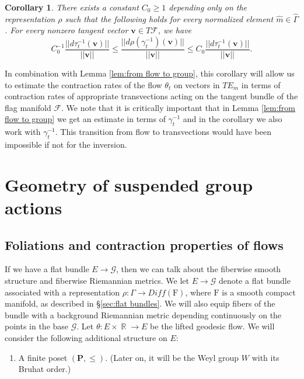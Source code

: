 \documentclass[12pt]{amsbook}%
\newtheorem{cor}[thm]{Corollary}
\theoremstyle{definition}
\theoremstyle{remark}
\numberwithin{section}{chapter}
\numberwithin{subsection}{section}
\numberwithin{figure}{chapter}
\DeclareMathOperator{\R}{\mathbb{R}}
\def\bP{{\mathbb{P}}}
\def\cF{{\mathscr{F}}}
\def\PP{{\mathbf{P}}}
\def\bv{\mathbf{v}}
\def\F{\mathrm{F}}
\def\Ga{\Gamma}
\def\ga{\gamma}
\def\cG{{\mathscr{G}}}
\def\kap{}
\begin{document}
{{\begin{cor}\label{cor:from group to transvections}
There exists a constant $C_0\geqslant 1$ depending only on the representation $\rho$ such that the following holds for every normalized element $\hat m\in \widehat\Ga$. For %
every nonzero tangent vector $\bv\in T\cF$, we have 
$$
C_0^{-1} \frac{||d\tau^{-1}_t(\bv)||}{||\bv||}\leqslant \frac{||d\rho(\ga^{-1}_t)(\bv)||}{||\bv||} \leqslant C_0  \frac{||d\tau^{-1}_t(\bv)||}{||\bv||}.
$$ 
\end{cor}

In combination with Lemma \ref{lem:from flow to group}, this corollary will allow us to estimate the contraction rates of the flow 
$\theta_t$ on vectors in $TE_{m}$ 
in terms of contraction rates of appropriate transvections acting on the tangent bundle of the flag manifold $\cF$. 
We note that it is critically important that in Lemma \ref{lem:from flow to group} we get an estimate in terms of $\ga_t^{-1}$ and in the corollary we also work 
with $\ga_t^{-1}$. This transition from flow to transvections would have been impossible if not for the inversion. 


\section{Geometry of suspended group actions}

\subsection{Foliations and contraction properties of flows} 

If we have a flat bundle $E\to \cG$, then we can talk about the fiberwise smooth structure and fiberwise Riemannian metrics. We let $E\to \cG$ denote a flat bundle associated with a representation $\rho: \Ga\to Diff(\F)$, where $\F$ is a smooth compact manifold, as described in \S \ref{sec:flat bundles}. We will also equip fibers of the bundle with a background Riemannian metric depending continuously on the points in the base $\cG$.  Let $\theta: E\times \R \to E$ be the lifted geodesic flow. We will consider the following additional structure on $E$:

\begin{enumerate}
\item A finite poset $(\PP, \le)$. (Later on, it will be the  
Weyl group $W$ with its Bruhat order.)  %


\end{enumerate}}}
\end{document}
